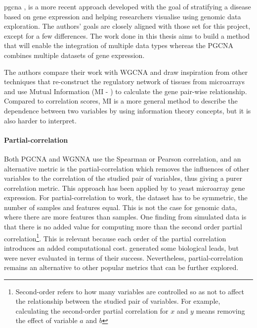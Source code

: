 \acrlong{pgcna} \citep{Care2019-ij}, is a more recent approach developed with the goal of stratifying a disease based on gene expression and helping researchers visualise using genomic data exploration. The authors' goals are closely aligned with those set for this project, except for a few differences. The work done in this thesis aims to build a method that will enable the integration of multiple data types whereas the PGCNA combines multiple datasets of gene expression. 

The authors compare their work with WGCNA and draw inspiration from other techniques that re-construct the regulatory network of tissues from microarrays and use Mutual Information (MI - \citet{Margolin2006-mc,Zhang2013-fs}) to calculate the gene pair-wise relationship. Compared to correlation scores, MI is a more general method to describe the dependence between two variables by using information theory concepts, but it is also harder to interpret.


\paragraph*{Partial-correlation} \label{s:lit:partial-corr}

Both PGCNA and WGNNA use the Spearman or Pearson correlation, and an alternative metric is the partial-correlation which removes the influences of other variables to the correlation of the studied pair of variables, thus giving a purer correlation metric. This approach has been applied by \citet{De_la_Fuente2004-ts} to yeast microarray gene expression. For partial-correlation to work, the dataset has to be symmetric, the number of samples and features equal. This is not the case for genomic data, where there are more features than samples. One finding from simulated data is that there is no added value for computing more than the second order partial correlation\footnote{Second-order refers to how many variables are controlled so as not to affect the relationship between the studied pair of variables. For example, calculating the second-order partial correlation for $x$ and $y$ means removing the effect of variable $a$ and $b$}. This is relevant because each order of the partial correlation introduces an added computational cost. \citet{De_la_Fuente2004-ts} generated some biological leads, but were never evaluated in terms of their success. Nevertheless, partial-correlation remains an alternative to other popular metrics that can be further explored.

